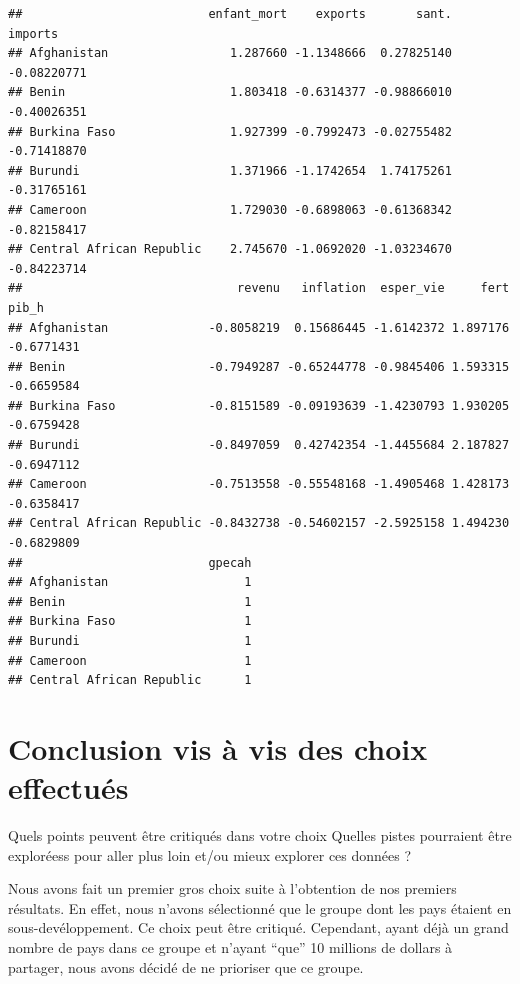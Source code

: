 \documentclass[
]{article}
\newenvironment{Shaded}{}{}
\newcommand{\DecValTok}[1]{#1}
\newcommand{\FunctionTok}[1]{#1}
\newcommand{\NormalTok}[1]{#1}
\newcommand{\OtherTok}[1]{\textcolor[rgb]{1.00,0.25,0.00}{#1}}
\newcommand{\SpecialCharTok}[1]{\textcolor[rgb]{0.00,0.50,0.50}{#1}}
\begin{document}
\begin{Shaded}
\end{Shaded}

\begin{verbatim}
##                          enfant_mort    exports       sant.     imports
## Afghanistan                 1.287660 -1.1348666  0.27825140 -0.08220771
## Benin                       1.803418 -0.6314377 -0.98866010 -0.40026351
## Burkina Faso                1.927399 -0.7992473 -0.02755482 -0.71418870
## Burundi                     1.371966 -1.1742654  1.74175261 -0.31765161
## Cameroon                    1.729030 -0.6898063 -0.61368342 -0.82158417
## Central African Republic    2.745670 -1.0692020 -1.03234670 -0.84223714
##                              revenu   inflation  esper_vie     fert      pib_h
## Afghanistan              -0.8058219  0.15686445 -1.6142372 1.897176 -0.6771431
## Benin                    -0.7949287 -0.65244778 -0.9845406 1.593315 -0.6659584
## Burkina Faso             -0.8151589 -0.09193639 -1.4230793 1.930205 -0.6759428
## Burundi                  -0.8497059  0.42742354 -1.4455684 2.187827 -0.6947112
## Cameroon                 -0.7513558 -0.55548168 -1.4905468 1.428173 -0.6358417
## Central African Republic -0.8432738 -0.54602157 -2.5925158 1.494230 -0.6829809
##                          gpecah
## Afghanistan                   1
## Benin                         1
## Burkina Faso                  1
## Burundi                       1
## Cameroon                      1
## Central African Republic      1
\end{verbatim}

\hypertarget{conclusion-vis-uxe0-vis-des-choix-effectuuxe9s}{%
\section{Conclusion vis à vis des choix
effectués}\label{conclusion-vis-uxe0-vis-des-choix-effectuuxe9s}}

Quels points peuvent être critiqués dans votre choix Quelles pistes
pourraient être exploréess pour aller plus loin et/ou mieux explorer ces
données ?

Nous avons fait un premier gros choix suite à l'obtention de nos
premiers résultats. En effet, nous n'avons sélectionné que le groupe
dont les pays étaient en sous-devéloppement. Ce choix peut être
critiqué. Cependant, ayant déjà un grand nombre de pays dans ce groupe
et n'ayant ``que'' 10 millions de dollars à partager, nous avons décidé
de ne prioriser que ce groupe.
\end{document}
